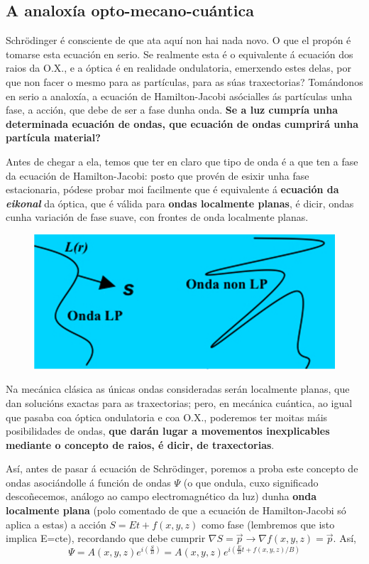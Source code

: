 \begin{refsection}
\begin{multicols}{2}
\subsection*{A analoxía opto-mecano-cuántica}

Schrödinger é consciente de que ata aquí non hai nada novo. O que el propón é
tomarse esta ecuación en serio. Se realmente esta é o equivalente á ecuación
dos raios da O.X., e a óptica é en realidade ondulatoria, emerxendo estes
delas, por que non facer o mesmo para as partículas, para as súas traxectorias?
Tomándonos en serio a analoxía, a ecuación de Hamilton-Jacobi asócialles ás
partículas unha fase, a acción, que debe de ser a fase dunha onda. \textbf{Se a
luz cumpría unha determinada ecuación de ondas, que ecuación de ondas cumprirá
unha partícula material?}

Antes de chegar a ela, temos que ter en claro que tipo de onda é a que ten a
fase da ecuación de Hamilton-Jacobi: posto que provén de esixir unha fase
estacionaria, pódese probar moi facilmente que é equivalente á \textbf{ecuación
da \textit{eikonal}} da óptica, que é válida para \textbf{ondas
localmente planas}, é dicir, ondas cunha variación de fase suave, con frontes
de onda localmente planas.

\begin{figure}[H]
   \centering
   \includegraphics[width=0.7\linewidth]{revistas/002/imaxes/hj3.png}
\end{figure}

Na mecánica clásica as únicas ondas consideradas serán localmente planas, que dan
solucións exactas para as traxectorias; pero, en mecánica cuántica, ao igual
que pasaba coa óptica ondulatoria e coa O.X., poderemos ter moitas máis
posibilidades de ondas, \textbf{que darán lugar a movementos inexplicables
mediante o concepto de raios, é dicir, de traxectorias}.

Así, antes de pasar á ecuación de Schrödinger, poremos a proba este concepto de
ondas asociándolle á función de ondas $\Psi$ (o que ondula, cuxo significado
descoñecemos, análogo ao campo electromagnético da luz) dunha \textbf{onda
localmente plana} (polo comentado de que a ecuación de Hamilton-Jacobi só
aplica a estas) a acción $S = Et + f(x,y,z)$ como fase (lembremos que isto
implica E=cte), recordando que debe cumprir $\nabla S=\vec{p}\rightarrow \nabla f(x,y,z) = \vec{p}$. Así,
\begin{equation}
    \Psi = A(x,y,z)e^{i(\frac{S}{B})} = A(x,y,z)e^{i(\frac{E}{B}t + f(x,y,z)/B)}
\end{equation}


\end{multicols}
\end{refsection}

